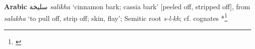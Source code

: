 \begin{etymology}\label{ety:salikha}
\textbf{Arabic} {سليخة} \textit{salīkha} `cinnamon bark; cassia bark' [peeled off, stripped off], from \textit{salakha} `to pull off, strip off; skin, flay'; Semitic root \textit{s-l-kh}; cf. cognates *\footnote{\textcite[491]{wehr_dictionary_1976}}
\end{etymology}